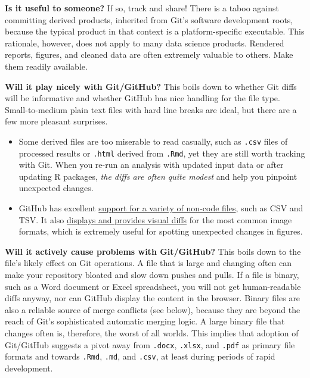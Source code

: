 \documentclass[12pt]{article}
\providecommand{\tightlist}{%
  \setlength{\itemsep}{0pt}\setlength{\parskip}{0pt}}
\begin{document}
\textbf{Is it useful to someone?} If so, track and share! There is a
taboo against committing derived products, inherited from Git's software
development roots, because the typical product in that context is a
platform-specific executable. This rationale, however, does not apply to
many data science products. Rendered reports, figures, and cleaned data
are often extremely valuable to others. Make them readily available.

\textbf{Will it play nicely with Git/GitHub?} This boils down to whether
Git diffs will be informative and whether GitHub has nice handling for
the file type. Small-to-medium plain text files with hard line breaks
are ideal, but there are a few more pleasant surprises.

\begin{itemize}
\tightlist
\item
  Some derived files are too miserable to read casually, such as
  \texttt{.csv} files of processed results or \texttt{.html} derived
  from \texttt{.Rmd}, yet they are still worth tracking with Git. When
  you re-run an analysis with updated input data or after updating R
  packages, \emph{the diffs are often quite modest} and help you
  pinpoint unexpected changes.
\item
  GitHub has excellent
  \href{https://help.github.com/categories/working-with-non-code-files/}{support
  for a variety of non-code files}, such as CSV and TSV. It also
  \href{https://help.github.com/articles/rendering-and-diffing-images/}{displays
  and provides visual diffs} for the most common image formats, which is
  extremely useful for spotting unexpected changes in figures.
\end{itemize}

\textbf{Will it actively cause problems with Git/GitHub?} This boils
down to the file's likely effect on Git operations. A file that is large
and changing often can make your repository bloated and slow down pushes
and pulls. If a file is binary, such as a Word document or Excel
spreadsheet, you will not get human-readable diffs anyway, nor can
GitHub display the content in the browser. Binary files are also a
reliable source of merge conflicts (see below), because they are beyond
the reach of Git's sophisticated automatic merging logic. A large binary
file that changes often is, therefore, the worst of all worlds. This
implies that adoption of Git/GitHub suggests a pivot away from
\texttt{.docx}, \texttt{.xlsx}, and \texttt{.pdf} as primary file
formats and towards \texttt{.Rmd}, \texttt{.md}, and \texttt{.csv}, at
least during periods of rapid development.
\end{document}
